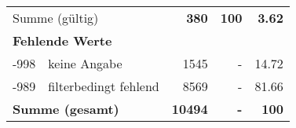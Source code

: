 \begin{longtable}{lXrrr}
     \midrule
     \multicolumn{2}{l}{Summe (gültig)} &
       \textbf{\num{380}} &
     \textbf{100} &
       \textbf{\num[round-mode=places,round-precision=2]{3,62}} \\
     \multicolumn{5}{l}{\textbf{Fehlende Werte}}\\
       -998 &
       keine Angabe &
         \num{1545} &
        - &
         \num[round-mode=places,round-precision=2]{14,72} \\
       -989 &
       filterbedingt fehlend &
         \num{8569} &
        - &
         \num[round-mode=places,round-precision=2]{81,66} \\
     \midrule
     \multicolumn{2}{l}{\textbf{Summe (gesamt)}} &
          \textbf{\num{10494}} &
        \textbf{-} &
        \textbf{100} \\
     \bottomrule
     \end{longtable}
     
